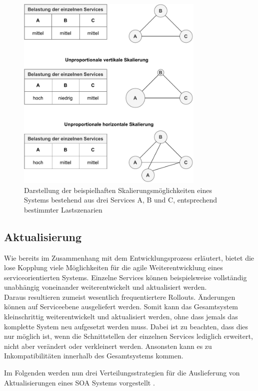 \begin{figure}[H]
    \centering
    \includegraphics[width=0.8\textwidth]{images/scaling.pdf}
    \caption{Darstellung der beispielhaften Skalierungsmöglichkeiten eines Systems bestehend aus drei Services A, B und C, entsprechend bestimmter Lastszenarien}
    \label{fig:scaling}
  \end{figure}

\subsection{Aktualisierung}
\label{sec:update}
Wie bereits im Zusammenhang mit dem Entwicklungsprozess erläutert, bietet die lose Kopplung viele Möglichkeiten für die agile Weiterentwicklung eines serviceorientierten Systems. Einzelne Services können beispielsweise vollständig unabhängig voneinander weiterentwickelt und aktualisiert werden.\\
Daraus resultieren zumeist wesentlich frequentiertere Rollouts. Änderungen können auf Serviceebene ausgeliefert werden. Somit kann das Gesamtsystem kleinschrittig weiterentwickelt und aktualisiert werden, ohne dass jemals das komplette System neu aufgesetzt werden muss. Dabei ist zu beachten, dass dies nur möglich ist, wenn die Schnittstellen der einzelnen Services lediglich erweitert, nicht aber verändert oder verkleinert werden. Ansonsten kann es zu Inkompatibilitäten innerhalb des Gesamtsystems kommen. 

Im Folgenden werden nun drei Verteilungsstrategien für die Auslieferung von Aktualisierungen eines SOA Systems vorgestellt \cite{STORZ.2021}.


